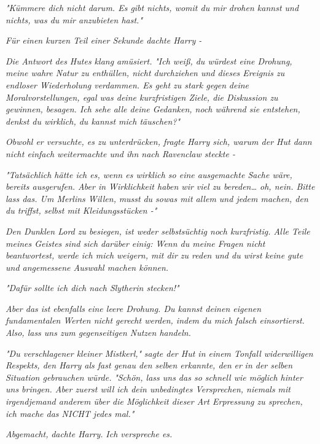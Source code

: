 {\emph{\emph{"Kümmere dich nicht darum. Es gibt nichts, womit du mir drohen kannst und nichts, was du mir anzubieten hast."}}

\emph{Für einen kurzen Teil einer Sekunde dachte Harry -}

\emph{Die Antwort des Hutes klang amüsiert.} \emph{\emph{"Ich weiß, du würdest eine Drohung, meine wahre Natur zu enthüllen, nicht durchziehen und dieses Ereignis zu endloser Wiederholung verdammen. Es geht zu stark gegen}} \emph{\emph{deine Moralvorstellungen, egal was deine kurzfristigen Ziele, die Diskussion zu gewinnen, besagen. Ich sehe alle deine Gedanken, noch während sie entstehen, denkst du wirklich, du kannst mich täuschen?"}}

\emph{Obwohl er versuchte, es zu unterdrücken, fragte Harry sich, warum der Hut dann nicht einfach weitermachte und ihn nach Ravenclaw steckte -}

\emph{\emph{"Tatsächlich hätte ich es, wenn es wirklich so eine ausgemachte Sache wäre, bereits ausgerufen. Aber in Wirklichkeit haben wir viel zu bereden… oh, nein. Bitte lass das. Um Merlins Willen,}} \emph{musst} \emph{\emph{du sowas mit allem und jedem machen, den du triffst, selbst mit Kleidungsstücken -"}}

\emph{Den Dunklen Lord zu besiegen, ist weder selbstsüchtig noch kurzfristig. Alle Teile meines Geistes sind sich darüber einig: Wenn du meine Fragen nicht beantwortest, werde ich mich weigern, mit dir zu reden und du wirst keine gute und angemessene Auswahl machen können.}

\emph{"Dafür sollte ich dich nach Slytherin stecken!"}

\emph{Aber das ist} \emph{ebenfalls} \emph{\emph{eine leere Drohung. Du kannst deinen eigenen fundamentalen Werten nicht gerecht werden, indem du mich falsch einsortierst. Also, lass uns zum gegenseitigen Nutzen handeln.}}

\emph{"Du verschlagener kleiner Mistkerl,"} \emph{sagte der Hut in einem Tonfall widerwilligen Respekts, den Harry als fast genau den selben erkannte, den} \emph{\emph{er}} \emph{in der selben Situation gebrauchen würde.} \emph{\emph{"Schön, lass uns das so schnell wie möglich hinter uns bringen. Aber zuerst will ich dein unbedingtes Versprechen, niemals mit irgendjemand anderem über die Möglichkeit dieser Art Erpressung zu sprechen, ich mache das NICHT jedes mal."}}

\emph{Abgemacht,} \emph{dachte Harry.} \emph{\emph{Ich verspreche es.}}

}
